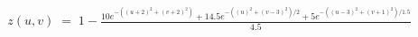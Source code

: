 \documentclass[preview]{standalone}
\begin{document}
\begin{align*}
z(u,v) \;=\; 1-\frac{10e^{-((u+2)^2+(v+2)^2)}+ 14.5e^{-((u)^2+(v-3)^2)/2}+ 5e^{-((u-3)^2+(v+1)^2)/1.5}}{4.5}
\end{align*}
\end{document}
